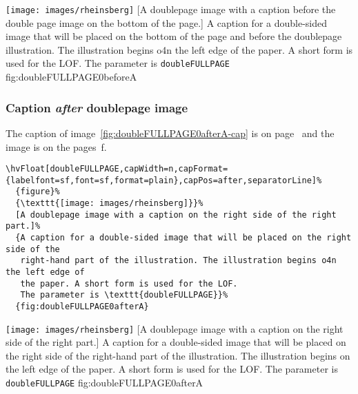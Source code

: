 \documentclass[twoside]{scrartcl}
\makeatletter
\let\hvBlindtext\Blindtext
\def\Blindtext{\par\color{black!40}\hvBlindtext\par\normalcolor}
\def\hvblindtext{\textcolor{black!40}{\blindtext@text}}
\makeatother
\begin{document}
%
  {\texttt{[image: images/rheinsberg]}}%
  [A doublepage image with a caption before the double page image on the bottom of the page.]%
  {A caption for a double-sided image that will be placed on the bottom of the page and before
   the doublepage illustration. The illustration begins o4n the left edge of 
   the paper. A short form is used for the LOF. 
   The parameter is \texttt{doubleFULLPAGE}}%
  {fig:doubleFULLPAGE0beforeA}

\Blindtext

\hvblindtext

\hvblindtext

\subsubsection{Caption \emph{after} doublepage image}
The caption of image~\ref{fig:doubleFULLPAGE0afterA-cap} is on page~\pageref{fig:doubleFULLPAGE0afterA-cap} and the image
is on the pages~\pageref{fig:doubleFULLPAGE0afterA}f.

\begin{lstlisting}
\hvFloat[doubleFULLPAGE,capWidth=n,capFormat={labelfont=sf,font=sf,format=plain},capPos=after,separatorLine]%
  {figure}%
  {\texttt{[image: images/rheinsberg]}}%
  [A doublepage image with a caption on the right side of the right part.]%
  {A caption for a double-sided image that will be placed on the right side of the
   right-hand part of the illustration. The illustration begins o4n the left edge of 
   the paper. A short form is used for the LOF. 
   The parameter is \texttt{doubleFULLPAGE}}%
  {fig:doubleFULLPAGE0afterA}
\end{lstlisting}


%
  {\texttt{[image: images/rheinsberg]}}%
  [A doublepage image with a caption on the right side of the right part.]%
  {A caption for a double-sided image that will be placed on the right side of the
   right-hand part of the illustration. The illustration begins on the left edge of 
   the paper. A short form is used for the LOF. 
   The parameter is \texttt{doubleFULLPAGE}}%
  {fig:doubleFULLPAGE0afterA}
\end{document}
